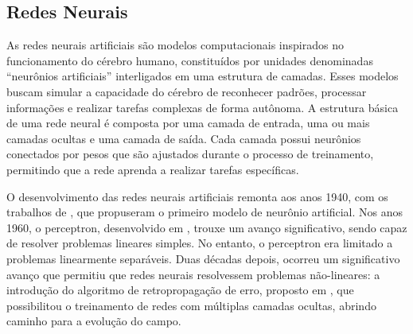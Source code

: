 

\subsection{Redes Neurais}
\label{sec:ann}

As redes neurais artificiais são modelos computacionais inspirados no funcionamento do cérebro humano, constituídos por unidades denominadas ``neurônios artificiais'' interligados em uma estrutura de camadas. Esses modelos buscam simular a capacidade do cérebro de reconhecer padrões, processar informações e realizar tarefas complexas de forma autônoma. A estrutura básica de uma rede neural é composta por uma camada de entrada, uma ou mais camadas ocultas e uma camada de saída. Cada camada possui neurônios conectados por pesos que são ajustados durante o processo de treinamento, permitindo que a rede aprenda a realizar tarefas específicas.

O desenvolvimento das redes neurais artificiais remonta aos anos 1940, com os trabalhos de , que propuseram o primeiro modelo de neurônio artificial. Nos anos 1960, o perceptron, desenvolvido em , trouxe um avanço significativo, sendo capaz de resolver problemas lineares simples. No entanto, o perceptron era limitado a problemas linearmente separáveis. Duas décadas depois, ocorreu um significativo avanço que permitiu que redes neurais resolvessem problemas não-lineares: a introdução do algoritmo de retropropagação de erro, proposto em , que possibilitou o treinamento de redes com múltiplas camadas ocultas, abrindo caminho para a evolução do campo.



